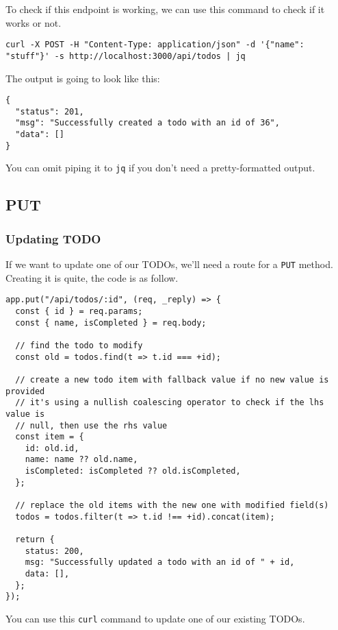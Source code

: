\documentclass[a4paper,14pt,titlepage]{article}
\def\c#1{\texttt{#1}}
\begin{document}
To check if this endpoint is working, we can use this command to check if it
works or not.

\begin{verbatim}
curl -X POST -H "Content-Type: application/json" -d '{"name": "stuff"}' -s http://localhost:3000/api/todos | jq
\end{verbatim}

The output is going to look like this:

\begin{verbatim}
{
  "status": 201,
  "msg": "Successfully created a todo with an id of 36",
  "data": []
}
\end{verbatim}

You can omit piping it to \c{jq} if you don't need a pretty-formatted output.

\newpage

\subsection{PUT}
\subsubsection{Updating TODO}

If we want to update one of our TODOs, we'll need a route for a \c{PUT} method.
Creating it is quite, the code is as follow.

\begin{verbatim}
app.put("/api/todos/:id", (req, _reply) => {
  const { id } = req.params;
  const { name, isCompleted } = req.body;

  // find the todo to modify
  const old = todos.find(t => t.id === +id);

  // create a new todo item with fallback value if no new value is provided
  // it's using a nullish coalescing operator to check if the lhs value is
  // null, then use the rhs value
  const item = {
    id: old.id,
    name: name ?? old.name,
    isCompleted: isCompleted ?? old.isCompleted,
  };

  // replace the old items with the new one with modified field(s)
  todos = todos.filter(t => t.id !== +id).concat(item);

  return {
    status: 200,
    msg: "Successfully updated a todo with an id of " + id,
    data: [],
  };
});
\end{verbatim}

You can use this \c{curl} command to update one of our existing TODOs.
\end{document}
